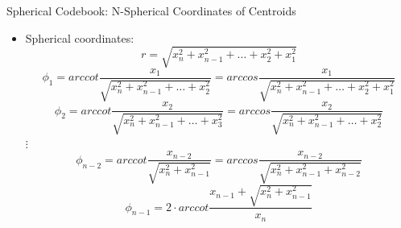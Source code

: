 \documentclass[10pt]{beamer}
\begin{document}
\begin{frame}{Spherical Codebook: N-Spherical Coordinates of Centroids}
  \begin{itemize}
    \item Spherical coordinates:\footnotemark
    \small
    \begin{equation*}
      r = \sqrt{x_{n}^2 + x_{n-1}^2 + \dotsc + x_{2}^2 + x_{1}^2}
    \end{equation*}
    \small
    \begin{equation*}
      \phi_{1} = arccot \frac{x_{1}}{\sqrt{x_{n}^2 + x_{n-1}^2 + \dotsc + x_{2}^2}} = arccos \frac{x_{1}}{\sqrt{x_{n}^2 + x_{n-1}^2 + \dotsc + x_{2}^2 + x_{1}^2}}
    \end{equation*}
    \small
    \begin{equation*}
      \phi_{2} = arccot \frac{x_{2}}{\sqrt{x_{n}^2 + x_{n-1}^2 + \dotsc + x_{3}^2}} = arccos \frac{x_{2}}{\sqrt{x_{n}^2 + x_{n-1}^2 + \dotsc + x_{2}^2}}
    \end{equation*}
    \centering $\vdots$
    \small
    \begin{equation*}
      \phi_{n-2} = arccot \frac{x_{n-2}}{\sqrt{x_{n}^2 + x_{n-1}^2}} = arccos \frac{x_{n-2}}{\sqrt{x_{n}^2 + x_{n-1}^2 + x_{n-2}^2}}
    \end{equation*}
    \small
    \begin{equation*}
      \phi_{n-1} = 2\cdot arccot\frac{x_{n-1} + \sqrt{x_{n}^2 + x_{n-1}^2}}{x_{n}}
    \end{equation*}
  \end{itemize}
  \begin{figure}
    \begin{minipage}{\textwidth}
             \\
    \end{minipage}
\end{figure}
\end{frame}
\end{document}
